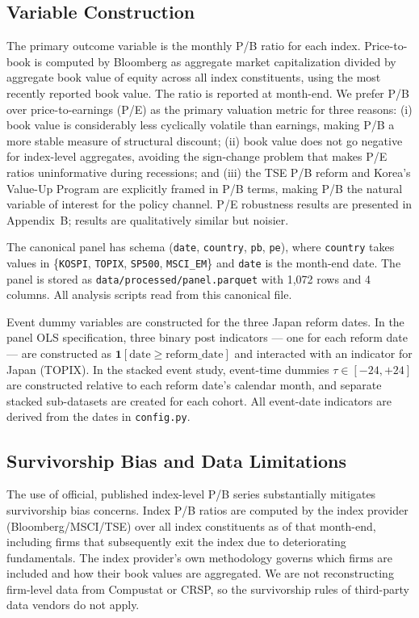 \documentclass[12pt]{article}
\begin{document}
\subsection{Variable Construction}

The primary outcome variable is the monthly P/B ratio for each index. Price-to-book is
computed by Bloomberg as aggregate market capitalization divided by aggregate book value
of equity across all index constituents, using the most recently reported book value.
The ratio is reported at month-end. We prefer P/B over price-to-earnings (P/E) as the
primary valuation metric for three reasons: (i) book value is considerably less cyclically
volatile than earnings, making P/B a more stable measure of structural discount; (ii) book
value does not go negative for index-level aggregates, avoiding the sign-change problem
that makes P/E ratios uninformative during recessions; and (iii) the TSE P/B reform and
Korea's Value-Up Program are explicitly framed in P/B terms, making P/B the natural
variable of interest for the policy channel. P/E robustness results are presented in
Appendix~B; results are qualitatively similar but noisier.

The canonical panel has schema (\texttt{date}, \texttt{country}, \texttt{pb}, \texttt{pe}),
where \texttt{country} takes values in \{\texttt{KOSPI}, \texttt{TOPIX}, \texttt{SP500},
\texttt{MSCI\_EM}\} and \texttt{date} is the month-end date. The panel is stored as
\texttt{data/processed/panel.parquet} with 1,072 rows and 4 columns. All analysis scripts
read from this canonical file.

Event dummy variables are constructed for the three Japan reform dates. In the panel OLS
specification, three binary post indicators --- one for each reform date --- are constructed
as $\mathbf{1}[\text{date} \geq \text{reform\_date}]$ and interacted with an indicator for
Japan (TOPIX). In the stacked event study, event-time dummies $\tau \in [-24, +24]$ are
constructed relative to each reform date's calendar month, and separate stacked sub-datasets
are created for each cohort. All event-date indicators are derived from the dates in
\texttt{config.py}.

\subsection{Survivorship Bias and Data Limitations}

The use of official, published index-level P/B series substantially mitigates survivorship
bias concerns. Index P/B ratios are computed by the index provider (Bloomberg/MSCI/TSE)
over all index constituents as of that month-end, including firms that subsequently exit
the index due to deteriorating fundamentals. The index provider's own methodology governs
which firms are included and how their book values are aggregated. We are not
reconstructing firm-level data from Compustat or CRSP, so the survivorship rules of
third-party data vendors do not apply.
\end{document}
